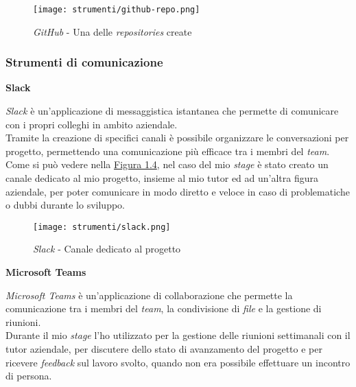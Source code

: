 \begin{figure}[H]
    \label{fig:github} 
    \centering
    \texttt{[image: strumenti/github-repo.png]}
    \caption{\textit{GitHub} - Una delle \textit{repositories} create}
\end{figure}

\pagebreak

\subsubsection{Strumenti di comunicazione}
\label{sez:strumenti-comunicazione}

\noindent \textbf{Slack\\}

\noindent \textit{Slack} è un'applicazione di messaggistica istantanea che permette di comunicare con i propri colleghi in ambito aziendale. \\
Tramite la creazione di specifici canali è possibile organizzare le conversazioni per progetto, permettendo una comunicazione più efficace tra i membri del \textit{team}.\\
Come si può vedere nella {\hyperref[fig:slack]{Figura 1.4}}, nel caso del mio \textit{stage} è stato creato un canale dedicato al mio progetto, insieme al mio tutor ed ad un'altra figura aziendale, 
per poter comunicare in modo diretto e veloce in caso di problematiche o dubbi durante lo sviluppo.

\begin{figure}[H]
    \label{fig:slack} 
    \centering
    \texttt{[image: strumenti/slack.png]}
    \caption{\textit{Slack} - Canale dedicato al progetto}
\end{figure}

\noindent \textbf{Microsoft Teams\\}

\noindent \textit{Microsoft Teams} è un'applicazione di collaborazione che permette la comunicazione tra i membri del \textit{team}, la condivisione di \textit{file} e la gestione di riunioni.\\
Durante il mio \textit{stage} l'ho utilizzato per la gestione delle riunioni settimanali con il tutor aziendale, per discutere dello stato di avanzamento del progetto e per ricevere \textit{feedback} sul lavoro svolto, quando
non era possibile effettuare un incontro di persona.
